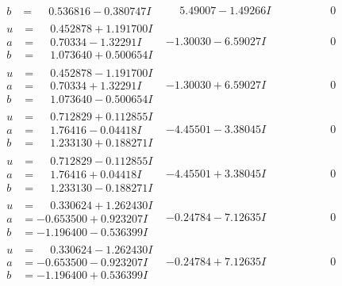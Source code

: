 \documentclass[1p]{elsarticle_modified}
\theoremstyle{definition}
\begin{document}
$$\begin{array}{c|c|c}
\begin{aligned}
b &= \phantom{-}0.536816 - 0.380747 I\end{aligned}
 & \phantom{-}5.49007 - 1.49266 I & \phantom{-0.000000 } 0 \\ \hline\begin{aligned}
u &= \phantom{-}0.452878 + 1.191700 I \\
a &= \phantom{-}0.70334 - 1.32291 I \\
b &= \phantom{-}1.073640 + 0.500654 I\end{aligned}
 & -1.30030 - 6.59027 I & \phantom{-0.000000 } 0 \\ \hline\begin{aligned}
u &= \phantom{-}0.452878 - 1.191700 I \\
a &= \phantom{-}0.70334 + 1.32291 I \\
b &= \phantom{-}1.073640 - 0.500654 I\end{aligned}
 & -1.30030 + 6.59027 I & \phantom{-0.000000 } 0 \\ \hline\begin{aligned}
u &= \phantom{-}0.712829 + 0.112855 I \\
a &= \phantom{-}1.76416 - 0.04418 I \\
b &= \phantom{-}1.233130 + 0.188271 I\end{aligned}
 & -4.45501 - 3.38045 I & \phantom{-0.000000 } 0 \\ \hline\begin{aligned}
u &= \phantom{-}0.712829 - 0.112855 I \\
a &= \phantom{-}1.76416 + 0.04418 I \\
b &= \phantom{-}1.233130 - 0.188271 I\end{aligned}
 & -4.45501 + 3.38045 I & \phantom{-0.000000 } 0 \\ \hline\begin{aligned}
u &= \phantom{-}0.330624 + 1.262430 I \\
a &= -0.653500 + 0.923207 I \\
b &= -1.196400 - 0.536399 I\end{aligned}
 & -0.24784 - 7.12635 I & \phantom{-0.000000 } 0 \\ \hline\begin{aligned}
u &= \phantom{-}0.330624 - 1.262430 I \\
a &= -0.653500 - 0.923207 I \\
b &= -1.196400 + 0.536399 I\end{aligned}
 & -0.24784 + 7.12635 I & \phantom{-0.000000 } 0 \\ \hline\begin{aligned}

\end{aligned}
\end{array}$$
\end{document}
